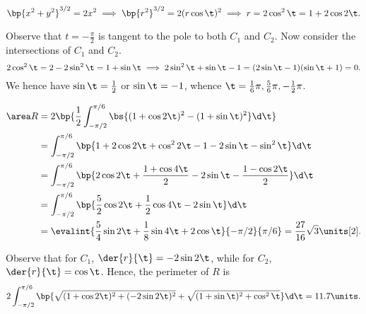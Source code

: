 \begin{solution}
    \begin{ppart}
        \[\bp{x^2 + y^2}^{3/2} = 2x^2 \implies \bp{r^2}^{3/2} = 2(r\cos \t)^2 \implies r = 2 \cos^2 \t = 1 + 2\cos2\t.\]
    \end{ppart}
    \begin{ppart}
        Observe that $t = -\frac\pi2$ is tangent to the pole to both $C_1$ and $C_2$. Now consider the intersections of $C_1$ and $C_2$. \[2\cos^2 \t = 2 - 2\sin^2 \t = 1 + \sin \t \implies 2\sin^2 \t + \sin \t -1 = (2\sin\t -1)(\sin \t + 1) = 0.\] We hence have $\sin\t = \frac12$ or $\sin \t = -1$, whence $\t = \frac16 \pi, \frac56 \pi, -\frac12 \pi$.

        \begin{align*}
            \area R &= 2 \bp{\frac12 \int_{-\pi/2}^{\pi/6} \bs{(1 + \cos 2\t)^2 - (1 + \sin \t)^2} \d \t} \\
            &= \int_{-\pi/2}^{\pi/6} \bp{1 + 2\cos2\t + \cos^2 2\t - 1 - 2\sin\t - \sin^2 \t} \d \t\\
            &= \int_{-\pi/2}^{\pi/6} \bp{2\cos 2\t + \frac{1 + \cos 4\t}{2} - 2\sin\t - \frac{1-\cos2\t}{2}} \d \t\\
            &= \int_{-\pi/2}^{\pi/6} \bp{\frac52 \cos 2\t + \frac12 \cos 4\t - 2\sin\t} \d \t\\
            &= \evalint{\frac54 \sin 2\t + \frac18 \sin 4\t + 2\cos\t}{-\pi/2}{\pi/6} = \frac{27}{16} \sqrt3 \units[2].
        \end{align*}
    \end{ppart}
    \begin{ppart}
        Observe that for $C_1$, $\der{r}{\t} = -2\sin 2\t$, while for $C_2$, $\der{r}{\t} = \cos \t$. Hence, the perimeter of $R$ is \[2 \int_{-\pi/2}^{\pi/6} \bp{\sqrt{(1 + \cos2\t)^2 + (-2\sin2\t)^2} + \sqrt{(1 + \sin\t)^2 + \cos^2 \t}} \d \t = 11.7 \units.\]
    \end{ppart}
\end{solution}

